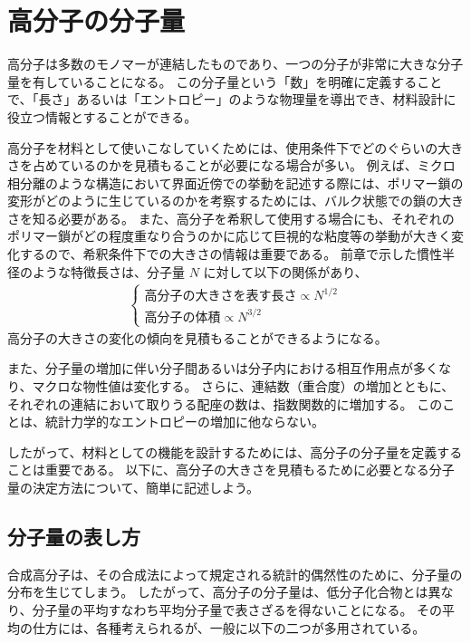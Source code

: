 \documentclass[a4paper,11pt]{ltjsarticle}
\begin{document}
\section{高分子の分子量}

高分子は多数のモノマーが連結したものであり、一つの分子が非常に大きな分子量を有していることになる。
この分子量という「数」を明確に定義することで、「長さ」あるいは「エントロピー」のような物理量を導出でき、材料設計に役立つ情報とすることができる。

高分子を材料として使いこなしていくためには、使用条件下でどのぐらいの大きさを占めているのかを見積もることが必要になる場合が多い。
例えば、ミクロ相分離のような構造において界面近傍での挙動を記述する際には、ポリマー鎖の変形がどのように生じているのかを考察するためには、バルク状態での鎖の大きさを知る必要がある。
また、高分子を希釈して使用する場合にも、それぞれのポリマー鎖がどの程度重なり合うのかに応じて巨視的な粘度等の挙動が大きく変化するので、希釈条件下での大きさの情報は重要である。
前章で示した慣性半径のような特徴長さは、分子量 $N$ に対して以下の関係があり、
\begin{align*}
\begin{cases}
\text{高分子の大きさを表す長さ} \propto N^{1/2} \\[8pt]
\text{高分子の体積} \propto N^{3/2}
\end{cases}
\end{align*}
高分子の大きさの変化の傾向を見積もることができるようになる。


また、分子量の増加に伴い分子間あるいは分子内における相互作用点が多くなり、マクロな物性値は変化する。
さらに、連結数（重合度）の増加とともに、それぞれの連結において取りうる配座の数は、指数関数的に増加する。
このことは、統計力学的なエントロピーの増加に他ならない。

したがって、材料としての機能を設計するためには、高分子の分子量を定義することは重要である。
以下に、高分子の大きさを見積もるために必要となる分子量の決定方法について、簡単に記述しよう。


\subsection{分子量の表し方}

合成高分子は、その合成法によって規定される統計的偶然性のために、分子量の分布を生じてしまう。
したがって、高分子の分子量は、低分子化合物とは異なり、分子量の平均すなわち平均分子量で表さざるを得ないことになる。
その平均の仕方には、各種考えられるが、一般に以下の二つが多用されている。
\end{document}
